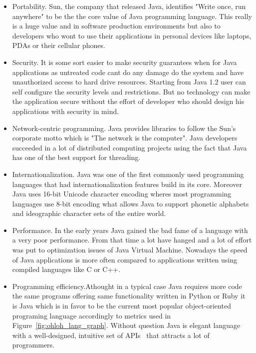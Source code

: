 \begin{itemize}
\item{Portability.} Sun, the company that released Java, identifies "Write once, run anywhere" to be the the core value of Java programming language. This really is a huge value and in software production environments but also to developers who wont to use their applications in personal devices like laptops, PDAs or their cellular phones.
\item{Security.} It is some sort easier to make security guarantees when for Java applications as untreated code cant do any damage do the system and have unauthorized access to hard drive resources. Starting from Java 1.2 user can self configure the security levels and restrictions. But no technology can make the application secure without the effort of developer who should design his applications with security in mind.    
\item{Network-centric programming. Java provides libraries to follow the Sun's corporate motto which is "The network is the computer". Java developers succeeded in a lot of distributed computing projects using the fact that Java has one of the best support for threading.}
\item{Internationalization. Java was one of the first commonly used programming languages that had internationalization features build in its core. Moreover Java uses 16-bit Unicode character encoding wheres most programming languages  use 8-bit encoding what allows Java to support phonetic alphabets and ideographic character sets of the entire world.}
\item{Performance. In the early years Java gained the bad fame of a language with a very poor performance. From that time a lot have hanged and a lot of effort was put to optimization issues of Java Virtual Machine. Nowadays the speed  of Java applications is more often compared to applications written using compiled languages like C or C++. }
\item{Programming efficiency.Athought in a typical case Java requires more code the same programs offering same functionality written in Python or Ruby it is Java which is in favor to be the current most popular object-oriented programing language accordingly to metrics used in Figure~\ref{fig:ohloh_lang_graph}. Without question Java is elegant language with a well-designed, intuitive set of APIs~\cite[page 6]{java_nutshell} that attracts a lot of programmers.}
\end{itemize}

